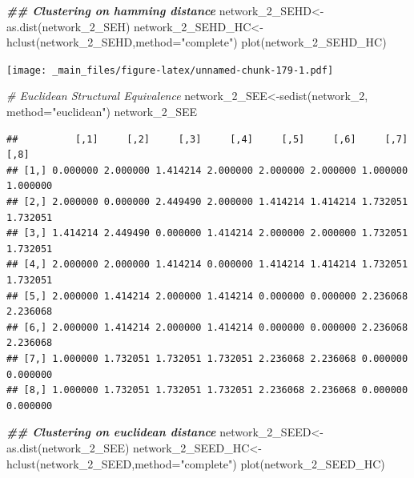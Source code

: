 \documentclass[
  notitlepage,
  onecolumn,
  openany]{book}
\newenvironment{Shaded}{\begin{snugshade}}{\end{snugshade}}
\newcommand{\AttributeTok}[1]{\textcolor[rgb]{0.77,0.63,0.00}{#1}}
\newcommand{\CommentTok}[1]{\textcolor[rgb]{0.56,0.35,0.01}{\textit{#1}}}
\newcommand{\DocumentationTok}[1]{\textcolor[rgb]{0.56,0.35,0.01}{\textbf{\textit{#1}}}}
\newcommand{\FunctionTok}[1]{\textcolor[rgb]{0.00,0.00,0.00}{#1}}
\newcommand{\NormalTok}[1]{#1}
\newcommand{\OtherTok}[1]{\textcolor[rgb]{0.56,0.35,0.01}{#1}}
\newcommand{\StringTok}[1]{\textcolor[rgb]{0.31,0.60,0.02}{#1}}
\begin{document}
\begin{Shaded}
\begin{Highlighting}[]
\DocumentationTok{\#\# Clustering on hamming distance}
\NormalTok{network\_2\_SEHD}\OtherTok{\textless{}{-}}\FunctionTok{as.dist}\NormalTok{(network\_2\_SEH)}
\NormalTok{network\_2\_SEHD\_HC}\OtherTok{\textless{}{-}}\FunctionTok{hclust}\NormalTok{(network\_2\_SEHD,}\AttributeTok{method=}\StringTok{"complete"}\NormalTok{)}
\FunctionTok{plot}\NormalTok{(network\_2\_SEHD\_HC)}
\end{Highlighting}
\end{Shaded}

\texttt{[image: \_main\_files/figure-latex/unnamed-chunk-179-1.pdf]}

\begin{Shaded}
\begin{Highlighting}[]
\CommentTok{\# Euclidean Structural Equivalence}
\NormalTok{network\_2\_SEE}\OtherTok{\textless{}{-}}\FunctionTok{sedist}\NormalTok{(network\_2, }\AttributeTok{method=}\StringTok{"euclidean"}\NormalTok{)}
\NormalTok{network\_2\_SEE}
\end{Highlighting}
\end{Shaded}

\begin{verbatim}
##          [,1]     [,2]     [,3]     [,4]     [,5]     [,6]     [,7]     [,8]
## [1,] 0.000000 2.000000 1.414214 2.000000 2.000000 2.000000 1.000000 1.000000
## [2,] 2.000000 0.000000 2.449490 2.000000 1.414214 1.414214 1.732051 1.732051
## [3,] 1.414214 2.449490 0.000000 1.414214 2.000000 2.000000 1.732051 1.732051
## [4,] 2.000000 2.000000 1.414214 0.000000 1.414214 1.414214 1.732051 1.732051
## [5,] 2.000000 1.414214 2.000000 1.414214 0.000000 0.000000 2.236068 2.236068
## [6,] 2.000000 1.414214 2.000000 1.414214 0.000000 0.000000 2.236068 2.236068
## [7,] 1.000000 1.732051 1.732051 1.732051 2.236068 2.236068 0.000000 0.000000
## [8,] 1.000000 1.732051 1.732051 1.732051 2.236068 2.236068 0.000000 0.000000
\end{verbatim}

\begin{Shaded}
\begin{Highlighting}[]
\DocumentationTok{\#\# Clustering on euclidean distance}
\NormalTok{network\_2\_SEED}\OtherTok{\textless{}{-}}\FunctionTok{as.dist}\NormalTok{(network\_2\_SEE)}
\NormalTok{network\_2\_SEED\_HC}\OtherTok{\textless{}{-}}\FunctionTok{hclust}\NormalTok{(network\_2\_SEED,}\AttributeTok{method=}\StringTok{"complete"}\NormalTok{)}
\FunctionTok{plot}\NormalTok{(network\_2\_SEED\_HC)}
\end{Highlighting}
\end{Shaded}
\end{document}
